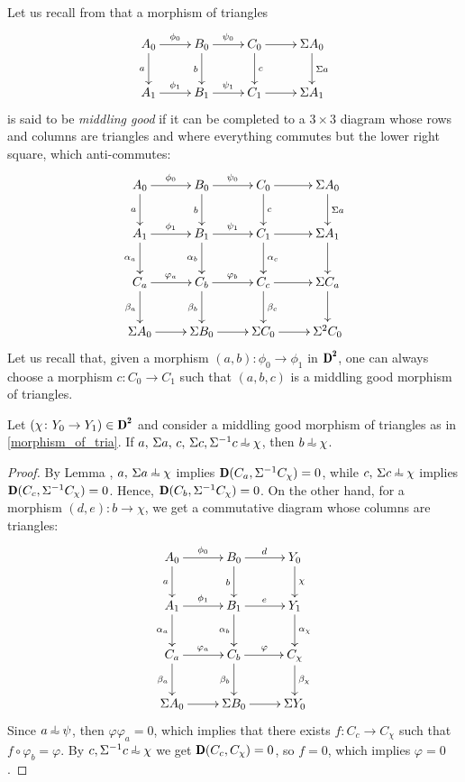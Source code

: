 Let us recall from \cite{neeman:new-axioms} that a morphism of triangles
\begin{equation}\label{morphism_of_tria}\xymatrix{
A_0\ar[r]^{ \phi_0 }\ar[d]_a&B_0\ar[r]^{ \psi_0 }\ar[d]_b&C_0\ar[r]\ar[d]^c&\Sigma A_0\ar[d]^{\Sigma a}\\
A_1\ar[r]^{ \phi_1 }&B_1\ar[r]^{ \psi_1 }&C_1\ar[r]&\Sigma A_1}\end{equation}
is said to be {\em middling good} if it can be completed to a $3\times 3$ diagram whose rows and columns are triangles and where everything commutes but the lower right square, which anti-commutes:
\begin{equation}\label{3x3}
\xymatrix{
A_0\ar[r]^{ \phi_0 }\ar[d]_a&B_0\ar[r]^{ \psi_0 }\ar[d]_b&C_0\ar[r]\ar[d]^c&\Sigma A_0\ar[d]^{\Sigma a}\\
A_1\ar[d]_{\alpha_a}\ar[r]^{ \phi_1 }&B_1\ar[d]_{\alpha_b}\ar[r]^{ \psi_1 }&C_1\ar[r]\ar[d]^{\alpha_c}&\Sigma A_1\ar[d]\\
C_a\ar[r]^{\varphi_a}\ar[d]_{\beta_a}&C_b\ar[r]^{\varphi_b}\ar[d]_{\beta_b}&C_c\ar[r]\ar[d]^{\beta_c}&\Sigma C_a\ar[d]^{}\\
\Sigma A_0\ar[r]&\Sigma B_0\ar[r]_{}&\Sigma C_0\ar[r]&\Sigma^2 C_0
}
\end{equation}
Let us recall that, given a morphism $(a,b)\colon  \phi_0 \to  \phi_1 $ in $\cD^\due$, one can always choose a morphism $c\colon C_0\to C_1$ such that $(a,b,c)$ is a middling good morphism of triangles. 
\begin{lemma}\label{extension}
Let $(\chi\colon  Y_0 \to  Y_1 )\in\cD^\due$ and consider a middling good morphism of triangles as in \eqref{morphism_of_tria}. 
If $a,\, \Sigma a,\, c,\, \Sigma c, \Sigma^{-1}c\horth \chi$, then $b\horth \chi$.
\end{lemma}
\begin{proof}
By Lemma , $a,\, \Sigma a\horth \chi$ implies $\cD(C_a,\Sigma^{-1}C_\chi)=0$, while  $c,\, \Sigma c\horth \chi$ implies $\cD(C_c,\Sigma^{-1}C_\chi)=0$. Hence,  $\cD(C_b,\Sigma^{-1}C_\chi)=0$. On the other hand, for a morphism $(d,e)\colon b\to \chi$, we get a commutative diagram whose columns are triangles:
$$\xymatrix{
A_0\ar[r]^{ \phi_0 }\ar[d]_a&B_0\ar[r]^d\ar[d]_b& Y_0 \ar[d]^\chi\\
A_1\ar[r]^{ \phi_1 }\ar[d]_{\alpha_a}&B_1\ar[r]^e\ar[d]_{\alpha_b}& Y_1 \ar[d]^{\alpha_\chi}\\
C_a\ar[r]^{\varphi_a}\ar[d]_{\beta_a}&C_b\ar[r]^{\varphi}\ar[d]_{\beta_b}&C_\chi\ar[d]^{\beta_\chi}\\
\Sigma A_0\ar[r]&\Sigma B_0\ar[r]&\Sigma  Y_0 
}$$ 
Since $a\horth \psi$, then $\varphi\varphi_a=0$, which implies that there exists $f\colon C_c\to C_\chi$ such that $f\circ \varphi_b=\varphi$. By $c, \Sigma^{-1}c\horth \chi$ we get $\cD(C_c,C_{\chi})=0$, so $f=0$, which implies $\varphi=0$.
\end{proof}

